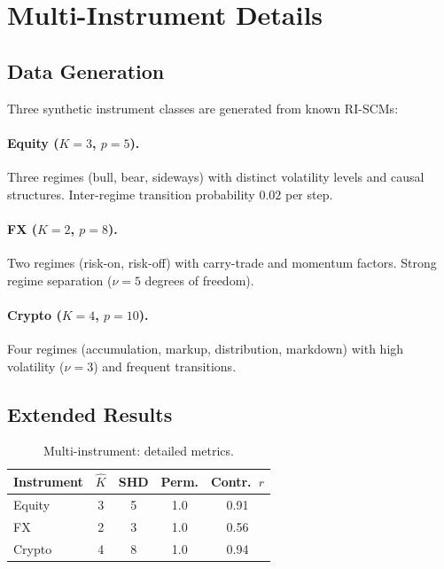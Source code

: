 \documentclass[11pt]{article}
\begin{document}
\section{Multi-Instrument Details}\label{app:multi}

\subsection{Data Generation}

Three synthetic instrument classes are generated from known RI-SCMs:

\paragraph{Equity ($K{=}3$, $p{=}5$).}
Three regimes (bull, bear, sideways) with distinct volatility levels
and causal structures.  Inter-regime transition probability $0.02$ per
step.

\paragraph{FX ($K{=}2$, $p{=}8$).}
Two regimes (risk-on, risk-off) with carry-trade and momentum factors.
Strong regime separation ($\nu = 5$ degrees of freedom).

\paragraph{Crypto ($K{=}4$, $p{=}10$).}
Four regimes (accumulation, markup, distribution, markdown) with high
volatility ($\nu = 3$) and frequent transitions.

\subsection{Extended Results}

\begin{table}[h]
\centering
\caption{Multi-instrument: detailed
metrics.}\label{tab:multi-detail}
\small
\begin{tabular}{@{}lcccc@{}}
\toprule
\textbf{Instrument} & $\hat{K}$ & \textbf{SHD}
  & \textbf{Perm.} & \textbf{Contr.\ $r$} \\
\midrule
Equity  & 3 & 5 & 1.0 & 0.91 \\
FX      & 2 & 3 & 1.0 & 0.56 \\
Crypto  & 4 & 8 & 1.0 & 0.94 \\
\bottomrule
\end{tabular}
\end{table}
\end{document}
